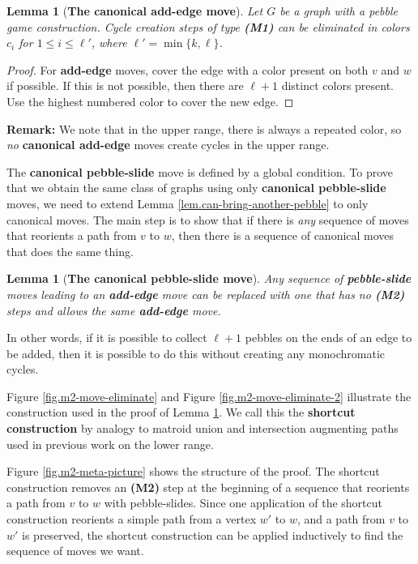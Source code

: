 \documentclass[Svgc,nospthms]{Svgc}
\newcommand{\reffig}[1]{Figure \ref{fig.#1}}
\newtheorem{lemma}[theorem]{Lemma}
\newcommand{\reflem}[1]{Lemma \ref{lem.#1}}
\newcommand{\labellem}[1]{\label{lem.#1}}
\begin{document}
	\begin{lemma}[{\bf The canonical add-edge move}]
		Let $G$ be a graph with a pebble game construction. 
		Cycle creation steps of type {\bf (M1)} can be eliminated in colors $c_{i}$ for $1\le i\le \ell'$, 
		where $\ell'=\min\{k,\ell\}$. \labellem{can-kill-m1-moves} 
	\end{lemma}
	\begin{proof}
		For {\bf add-edge} moves, cover the edge with a color present on both $v$ and $w$ 
		if possible. If this is not possible, then there are $\ell+1$ 
		distinct colors present. Use the highest numbered color to cover 
		the new edge. 
	 \end{proof}
	
	{\bf Remark:} We note that in the upper range, there is always a repeated color, so 
	{\it no} {\bf canonical add-edge} moves create cycles in the upper range.
	
	
	The {\bf canonical pebble-slide} move is defined by a global condition.  To prove that
	we obtain the same class of graphs using only {\bf canonical pebble-slide} moves, 
	we need to extend \reflem{can-bring-another-pebble} to only 
	canonical moves.  The main step is to show that if there is {\it any }
	sequence of moves that reorients a path from $v$ to $w$, then there is 
	a sequence of canonical moves that does the same thing.
	
	\begin{lemma}[{\bf The canonical pebble-slide move}]\labellem{kill-m2-moves-locally}
		Any sequence of {\bf pebble-slide} moves leading to an {\bf add-edge}
		move can be replaced with one that has no {\bf (M2)} steps and allows the
		same {\bf add-edge} move. 
	\end{lemma}
	In other words, if it is possible to collect $\ell+1$ pebbles on the ends 
	of an edge to be added, then it is possible to do this without creating 
	any monochromatic cycles.
		
	\reffig{m2-move-eliminate} and \reffig{m2-move-eliminate-2} illustrate the
	construction used in the proof of \reflem{kill-m2-moves-locally}.  We call this 
	the {\bf shortcut construction} by analogy to matroid union and intersection 
	augmenting paths used in previous work on the lower range.
	
	\reffig{m2-meta-picture} shows the structure of the proof.  The shortcut construction 
	removes an {\bf (M2)} step at the beginning of a sequence that 
	reorients a path from $v$ to $w$ with pebble-slides.  Since one application of the shortcut construction 
	reorients a simple path from a vertex $w'$ to $w$, and a path from $v$ to $w'$ is 
	preserved, the shortcut construction can be applied inductively to find the sequence of moves
	we want.
	
\end{document}
